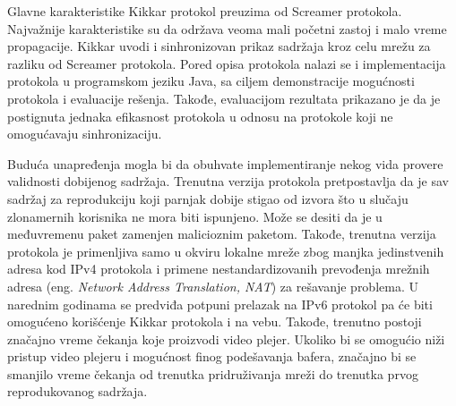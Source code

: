 \documentclass[12pt,oneside]{memoir}
\begin{document}
Glavne karakteristike Kikkar protokol preuzima od Screamer protokola. Najvažnije karakteristike su da održava veoma mali početni zastoj i malo vreme propagacije. Kikkar uvodi i sinhronizovan prikaz sadržaja kroz celu mrežu za razliku od Screamer protokola. Pored opisa protokola nalazi se i implementacija protokola u programskom jeziku Java, sa ciljem demonstracije mogućnosti protokola i evaluacije rešenja. Takođe, evaluacijom rezultata prikazano je da je postignuta jednaka efikasnost protokola u odnosu na protokole koji ne omogućavaju sinhronizaciju. 

Buduća unapređenja mogla bi da obuhvate implementiranje nekog vida provere validnosti dobijenog sadržaja. Trenutna verzija protokola pretpostavlja da je sav sadržaj za reprodukciju koji parnjak dobije stigao od izvora što u slučaju zlonamernih korisnika ne mora biti ispunjeno. Može se desiti da je u međuvremenu paket zamenjen malicioznim paketom. Takođe, trenutna verzija protokola je primenljiva samo u okviru lokalne mreže zbog manjka jedinstvenih adresa kod IPv4 protokola i primene nestandardizovanih prevođenja mrežnih adresa (eng. \textit{Network Address Translation, NAT}) za rešavanje problema. U narednim godinama se predviđa potpuni prelazak na IPv6 protokol pa će biti omogućeno korišćenje Kikkar protokola i na vebu. Takođe, trenutno postoji značajno vreme čekanja koje proizvodi video plejer. Ukoliko bi se omogućio niži pristup video plejeru i mogućnost finog podešavanja bafera, značajno bi se smanjilo vreme čekanja od trenutka pridruživanja mreži do trenutka prvog reprodukovanog sadržaja. 



\literatura

\backmatter

\end{document}
